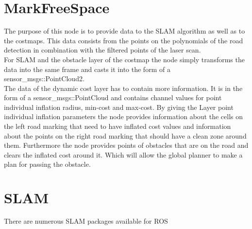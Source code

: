 \section{MarkFreeSpace}

The purpose of this node is to provide data to the SLAM algorithm as well as to the costmaps. This data consists from the points on the polynomials of the road detection in combination with the filtered points of the laser scan.\\

For SLAM and the obstacle layer of the costmap the node simply transforms the data into the same frame and casts it into the form of a sensor\_msgs::PointCloud2.\\

The data of the dynamic cost layer has to contain more information. It is in the form of a sensor\_msgs::PointCloud and contains channel values for point individual inflation radius, min-cost and max-cost. By giving the Layer point individual inflation parameters the node provides information about the cells on the left road marking that need to have inflated cost values and information about the points on the right road marking that should have a clean zone around them. Furthermore the node provides points of obstacles that are on the road and clears the inflated cost around it. Which will allow the global planner to make a plan for passing the obstacle.

\section{SLAM}
There are numerous SLAM packages available for ROS




